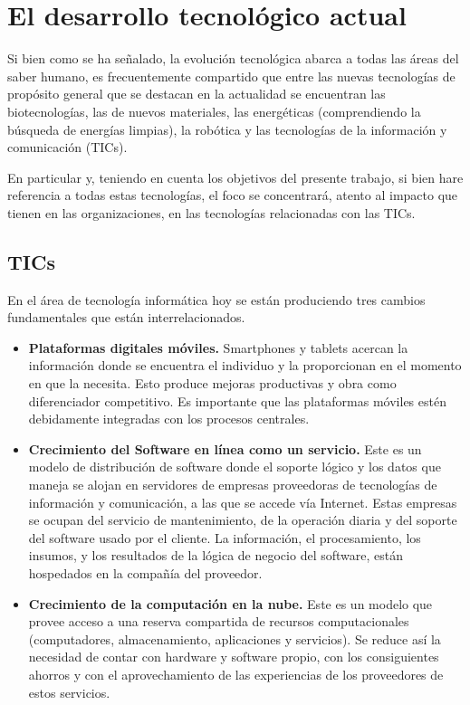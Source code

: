 \documentclass[a4paper, 12pt]{article}
\begin{document}
\section{El desarrollo tecnológico actual}
\label{sec:DesarrolloTecnologicoActual}
Si bien como se ha señalado, la evolución tecnológica abarca a todas las áreas del saber humano, es frecuentemente compartido que entre las nuevas tecnologías de propósito general que se destacan en la actualidad se encuentran las biotecnologías, las de nuevos materiales, las energéticas (comprendiendo la búsqueda de energías limpias), la robótica y las tecnologías de la información y comunicación (TICs).

En particular y, teniendo en cuenta los objetivos del presente trabajo, si bien hare referencia a todas estas tecnologías, el foco se concentrará, atento al impacto que tienen en las organizaciones, en las tecnologías relacionadas con las TICs.

\subsection{TICs}
\label{TICS}
En el área de tecnología informática hoy se están produciendo tres cambios fundamentales que están interrelacionados.

\begin{itemize}
\item \textbf{Plataformas digitales móviles.} Smartphones y tablets acercan la información donde se encuentra el individuo y la proporcionan en el momento en que la necesita. Esto produce mejoras productivas y obra como diferenciador competitivo. Es importante que las plataformas móviles estén debidamente integradas con los procesos centrales.

\item \textbf{Crecimiento del Software en línea como un servicio.}
Este es un modelo de distribución de software donde el soporte lógico y los datos que maneja se alojan en servidores de empresas proveedoras de tecnologías de información y comunicación, a las que se accede vía Internet. Estas empresas se ocupan del servicio de mantenimiento, de la operación diaria y del soporte del software usado por el cliente. La información, el procesamiento, los insumos, y los resultados de la lógica de negocio del software, están hospedados en la compañía del proveedor.

\item \textbf{Crecimiento de la computación en la nube.}
Este es un modelo que provee acceso a una reserva compartida de recursos computacionales (computadores, almacenamiento, aplicaciones y servicios). 
Se reduce así la necesidad de contar con hardware y software propio, con los consiguientes ahorros y con el aprovechamiento de las experiencias de los proveedores de estos servicios.

\end{itemize}
\end{document}
